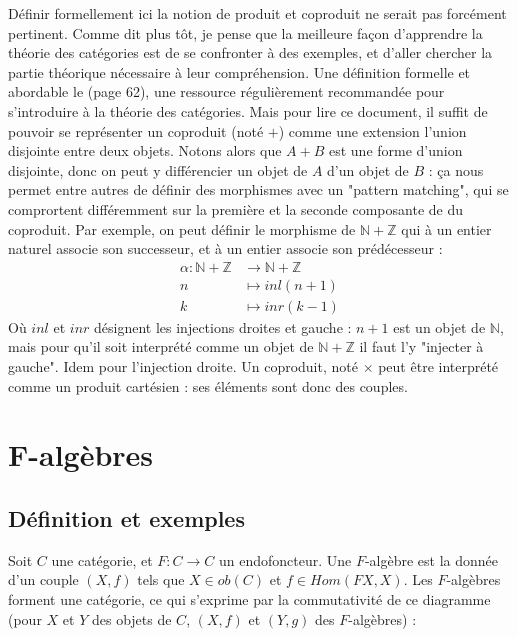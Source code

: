 \documentclass{article}
\newcommand{\N}{\mathbb{N}}
\newcommand{\Z}{\mathbb{Z}}
\begin{document}
Définir formellement ici la notion de produit et coproduit ne serait pas forcément pertinent. Comme dit plus tôt, je pense que la meilleure façon d'apprendre la théorie des catégories est de se confronter à des exemples, et d'aller chercher la partie théorique nécessaire à leur compréhension. Une définition formelle et abordable le \cite{MacLane} (page 62), une ressource régulièrement recommandée pour s'introduire à la théorie des catégories. Mais pour lire ce document, il suffit de pouvoir se représenter un coproduit (noté $+$) comme une extension l'union disjointe entre deux objets. Notons alors que $A+B$ est une forme d'union disjointe, donc on peut y différencier un objet de $A$ d'un objet de $B$ : ça nous permet entre autres de définir des morphismes avec un "pattern matching", qui se comprortent différemment sur la première et la seconde composante de du coproduit. Par exemple, on peut définir le morphisme de $\N + \Z$ qui à un entier naturel associe son successeur, et à un entier associe son prédécesseur : 
\begin{align*}
     \alpha : \N + \Z & \rightarrow \N + \Z \\ 
     n & \mapsto inl(n+1) \\ 
     k & \mapsto inr(k-1)     
\end{align*}
Où $inl$ et $inr$ désignent les injections droites et gauche : $n+1$ est un objet de $\N$, mais pour qu'il soit interprété comme un objet de $\N + \Z$ il faut l'y "injecter à gauche". Idem pour l'injection droite. Un coproduit, noté $\times$ peut être interprété comme un produit cartésien : ses éléments sont donc des couples.


\section{F-algèbres}

\subsection{Définition et exemples}
Soit $C$ une catégorie, et $F :C \longrightarrow C$ un endofoncteur. Une $F$-algèbre est la donnée d'un couple $(X,f)$ tels que $X \in ob(C)$ et $f \in Hom(F X, X)$. Les $F$-algèbres forment une catégorie, ce qui s'exprime par la commutativité de ce diagramme (pour $X$ et $Y$ des objets de $C$, $(X,f)$ et $(Y,g)$ des $F$-algèbres) : 

\begin{center}
\end{center}
\end{document}
